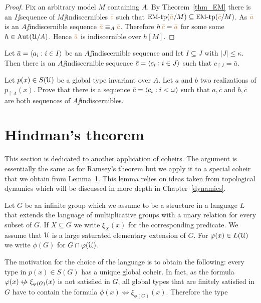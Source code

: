 \documentclass[creche.tex]{subfiles}
\begin{document}
\begin{proof}
  Fix an arbitrary model $M$ containing $A$. By Theorem~\ref{thm_EM} there is an $I\jj$sequence of $M\jj$indiscernibles ${\color{brown}\bar c}$ such that $\textrm{{\small EM}\mbox{-}tp}({\color{brown}\bar a}/M)\subseteq\textrm{{\small EM}\mbox{-}tp}({\color{brown}\bar c}/M)$. As ${\color{brown}\bar a}$ is an $A\jj$indiscernible sequence ${\color{brown}\bar a}\equiv_A{\color{brown}\bar c}$. Therefore $h\,{\color{brown}\bar c}={\color{brown}\bar a}$ for some some $h\in\textrm{Aut\kern.15ex}(\EuScript U/A)$. Hence ${\color{brown}\bar a}$ is indiscernible over $h[M]$.
\end{proof}

\begin{exercise}
Let $\bar a=\langle a_i:i\in I\rangle$ be an $A\jj$indiscernible sequence and let $I\subseteq J$ with $|J|\le \kappa$. Then there is an $A\jj$indiscernible sequence $\bar c=\langle c_i:i\in J\rangle$ such that $c_{\restriction I}=\bar a$.\QED
\end{exercise}

\begin{exercise}
Let  $p(x)\in S(\EuScript U)$ be a global type invariant over $A$. Let $a$ and $b$ two realizations of $p_{\restriction A}(x)$. Prove that there is a sequence $\bar c=\langle c_i:i<\omega\rangle$ such that $a,\bar c$ and $b,\bar c$ are both sequences of $A\jj$indiscernibles.\QED
\end{exercise}
\section{Hindman's theorem} 

This section is dedicated to another application of coheirs. The argument is essentially the same as for Ramsey's theorem but we apply it to a special coheir that we obtain from Lemma~\ref{}. This lemma relies on ideas taken from topological dynamics which will be discussed in more depth in Chapter~\ref{dynamics}.

Let $G$ be an infinite group which we assume to be a structure in a language $L$ that extends the language of multiplicative groups with a unary relation for every subset of $G$. If $X\subseteq G$ we write $\xi_X(x)$ for the corresponding predicate. We assume that $\EuScript U$ is a large saturated elementary extension of $G$. For $\varphi(x)\in L(\EuScript U)$ we write $\phi(G)$ for $G\cap\varphi(\EuScript U)$.

The motivation for the choice of the language is to obtain the following: every type in $p(x)\in S(G)$ has a unique global coheir. In fact, as the formula $\phi(x)\niff\xi_{\phi(G)}(x)$ is not satisfied in $G$, all global types that are finitely satisfied in $G$ have to contain the formula $\phi(x)\iff\xi_{\phi(G)}(x)$. Therefore the type 
\end{document}
